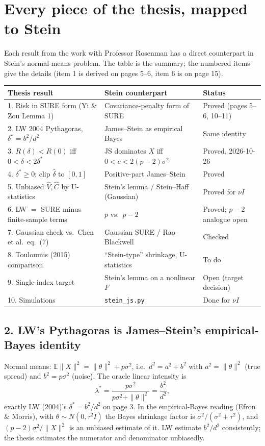 \documentclass[12pt]{article}
\begin{document}
\newpage
\section*{Every piece of the thesis, mapped to Stein}
Each result from the work with Professor Rosenman has a direct counterpart in Stein's normal-means
problem. The table is the summary; the numbered items give the details (item 1 is derived on pages 5--6,
item 6 is on page 15).

\begin{center}
\small
\begin{tabular}{@{}p{}p{}p{}@{}}
\toprule
Thesis result & Stein counterpart & Status \\
\midrule
1. Risk in SURE form (Yi \& Zou Lemma 1) & Covariance-penalty form of SURE & Proved (pages 5--6, 10--11) \\
2. LW 2004 Pythagoras, $\delta^*=b^2/d^2$ & James--Stein as empirical Bayes & Same identity \\
3. $R(\delta)<R(0)$ iff $0<\delta<2\delta^*$ & JS dominates $X$ iff $0<c<2(p-2)\sigma^2$ & Proved, 2026-10-26 \\
4. $\delta^*\ge0$; clip $\hat\delta$ to $[0,1]$ & Positive-part James--Stein & Proved \\
5. Unbiased $\hat V,\hat C$ by U-statistics & Stein's lemma / Stein--Haff (Gaussian) & Proved for $\nu I$ \\
6. LW $=$ SURE minus finite-sample terms & $p$ vs.\ $p-2$ & Proved; $p-2$ analogue open \\
7. Gaussian check vs.\ Chen et al.\ eq.~(7) & Gaussian SURE / Rao--Blackwell & Checked \\
8. Touloumis (2015) comparison & ``Stein-type'' shrinkage, U-statistics & To do \\
9. Single-index target & Stein's lemma on a nonlinear $F$ & Open (target decision) \\
10. Simulations & \texttt{stein\_js.py} & Done for $\nu I$ \\
\bottomrule
\end{tabular}
\end{center}

\subsection*{2. LW's Pythagoras is James--Stein's empirical-Bayes identity}
Normal means: $\mathbb{E}\|X\|^2=\|\theta\|^2+p\sigma^2$, i.e.\ $d^2=a^2+b^2$ with $a^2=\|\theta\|^2$ (true
spread) and $b^2=p\sigma^2$ (noise). The oracle linear intensity is
\[
\lambda^*=\frac{p\sigma^2}{p\sigma^2+\|\theta\|^2}=\frac{b^2}{d^2},
\]
exactly LW (2004)'s $\delta^*=b^2/d^2$ on page 3. In the empirical-Bayes reading (Efron \& Morris), with
$\theta\sim N(0,\tau^2I)$ the Bayes shrinkage factor is $\sigma^2/(\sigma^2+\tau^2)$, and
$(p-2)\sigma^2/\|X\|^2$ is an unbiased estimate of it. LW estimate $b^2/d^2$ consistently; the thesis
estimates the numerator and denominator unbiasedly.
\end{document}
